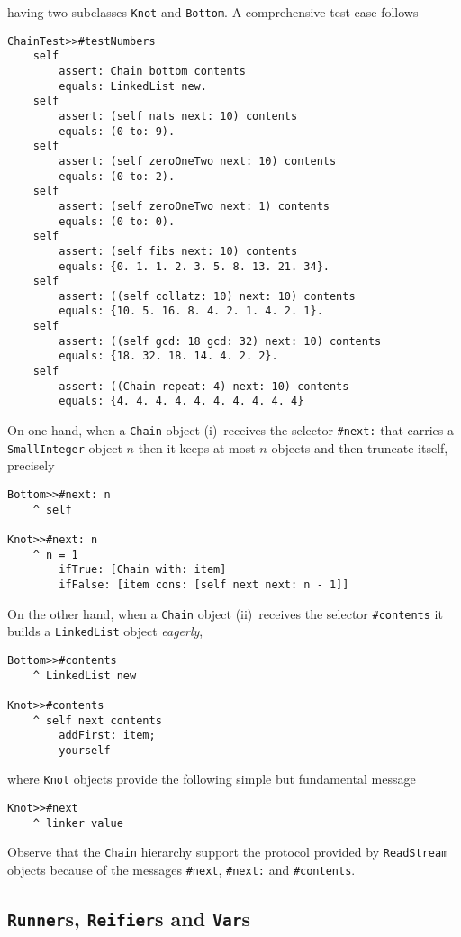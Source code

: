 \documentclass[a4paper,12pt]{article}
\begin{document}
having two subclasses \Verb|Knot| and \Verb|Bottom|. A comprehensive
test case follows
\begin{verbatim}
ChainTest>>#testNumbers
    self
        assert: Chain bottom contents
        equals: LinkedList new.
    self
        assert: (self nats next: 10) contents
        equals: (0 to: 9).
    self
        assert: (self zeroOneTwo next: 10) contents
        equals: (0 to: 2).
    self
        assert: (self zeroOneTwo next: 1) contents
        equals: (0 to: 0).
    self
        assert: (self fibs next: 10) contents
        equals: {0. 1. 1. 2. 3. 5. 8. 13. 21. 34}.
    self
        assert: ((self collatz: 10) next: 10) contents
        equals: {10. 5. 16. 8. 4. 2. 1. 4. 2. 1}.
    self
        assert: ((self gcd: 18 gcd: 32) next: 10) contents
        equals: {18. 32. 18. 14. 4. 2. 2}.
    self
        assert: ((Chain repeat: 4) next: 10) contents
        equals: {4. 4. 4. 4. 4. 4. 4. 4. 4. 4}
\end{verbatim}

On one hand, when a \Verb|Chain| object (i)~receives the selector
\Verb|#next:| that carries a \Verb|SmallInteger| object $n$ then it keeps at most
$n$ objects and then truncate itself, precisely
\begin{verbatim}
Bottom>>#next: n
    ^ self

Knot>>#next: n
    ^ n = 1
        ifTrue: [Chain with: item]
        ifFalse: [item cons: [self next next: n - 1]]
\end{verbatim}

On the other hand, when a \Verb|Chain| object (ii)~receives the selector
\Verb|#contents| it builds a \Verb|LinkedList| object \textit{eagerly},
\begin{verbatim}
Bottom>>#contents
    ^ LinkedList new

Knot>>#contents
    ^ self next contents
        addFirst: item;
        yourself
\end{verbatim}
where \Verb|Knot| objects provide the following simple but fundamental message
\begin{verbatim}
Knot>>#next
    ^ linker value
\end{verbatim}
Observe that the \Verb|Chain| hierarchy support the protocol provided
by \Verb|ReadStream| objects because of the messages \Verb|#next|, \Verb|#next:|
and \Verb|#contents|.

\subsection{\texttt{Runner}s, \texttt{Reifier}s and \texttt{Var}s}
\end{document}
